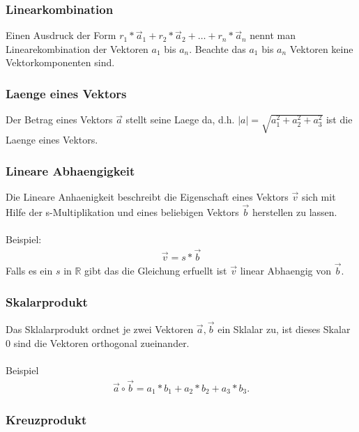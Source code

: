\documentclass[a4paper]{article} %
\begin{document}
	\subsubsection{Linearkombination}
	Einen Ausdruck der Form $r_1*\vec{a}_1 + r_2*\vec{a}_2 + \hdots + r_n*\vec{a}_n $ nennt man Linearekombination der Vektoren $a_1$ bis $a_n$.
	Beachte das $a_1$ bis $a_n$ Vektoren keine Vektorkomponenten sind.
	\subsubsection{Laenge eines Vektors}
	Der Betrag eines Vektors $\vec{a}$ stellt seine Laege da, d.h. $|a|=\sqrt{a_1^2+a_2^2+a_3^2}$ ist die Laenge eines Vektors.
	\subsubsection{Lineare Abhaengigkeit}
	Die Lineare Anhaenigkeit beschreibt die Eigenschaft eines Vektors $\vec{v}$ sich mit Hilfe der s-Multiplikation und eines beliebigen Vektors $\vec{b}$ herstellen zu lassen.
	\\\\Beispiel:\\
	\begin{align*} \vec{v}=s*\vec{b} \end{align*}
	Falls es ein $s$ in $\mathbb{R}$ gibt das die Gleichung erfuellt ist $\vec{v}$ linear Abhaengig von $\vec{b}$.
	\pagebreak
	\subsubsection{Skalarprodukt}
	Das Sklalarprodukt ordnet je zwei Vektoren $\vec{a},\vec{b}$ ein Sklalar zu, ist dieses Skalar $0$ sind die Vektoren orthogonal zueinander.\\\\Beispiel  \begin{align*} \vec{a} \circ \vec{b}=a_1*b_1+a_2*b_2+a_3*b_3. \end{align*}
	\subsubsection{Kreuzprodukt}
\end{document}
